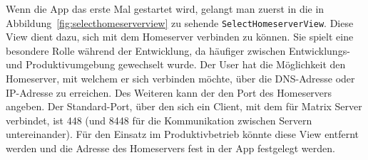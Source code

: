     Wenn die App das erste Mal gestartet wird, gelangt man zuerst in die in Abbildung~\ref{fig:selecthomeserverview} zu sehende \texttt{SelectHomeserverView}.
    Diese View dient dazu, sich mit dem Homeserver verbinden zu können.
    Sie spielt eine besondere Rolle während der Entwicklung, da häufiger zwischen Entwicklungs- und Produktivumgebung gewechselt wurde.
    Der User hat die Möglichkeit den Homeserver, mit welchem er sich verbinden möchte, über die DNS-Adresse oder IP-Adresse zu erreichen.
    Des Weiteren kann der den Port des Homeservers angeben.
    Der Standard-Port, über den sich ein Client, mit dem für Matrix Server verbindet, ist 448 (und 8448 für die Kommunikation zwischen Servern untereinander).
    Für den Einsatz im Produktivbetrieb könnte diese View entfernt werden und die Adresse des Homeservers fest in der App festgelegt werden.

